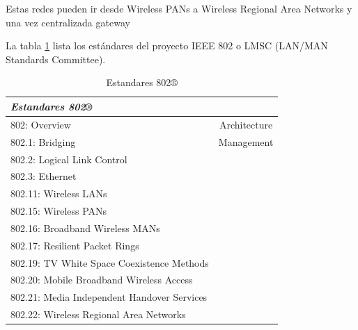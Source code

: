 Estas redes pueden ir desde Wireless PANs a Wireless Regional Area Networks y una vez centralizada gateway


La tabla \ref{tab:802} lista los estándares del proyecto IEEE 802 o LMSC (LAN/MAN Standards Committee).

\vspace{10px}

\begin{table}[ht]
	\centering
	\caption{Estandares 802®}
	\begin{tabular}{@{} l *1c @{}}    \toprule
		\emph{\textbf{Estandares 802®}} \\
		\midrule
        802: Overview & Architecture\\
        802.1: Bridging & Management\\
        802.2: Logical Link Control\\
        802.3: Ethernet\\
        802.11: Wireless LANs\\
        802.15: Wireless PANs\\
        802.16: Broadband Wireless MANs\\
        802.17: Resilient Packet Rings\\
        802.19: TV White Space Coexistence Methods\\
        802.20: Mobile Broadband Wireless Access\\
        802.21: Media Independent Handover Services\\
        802.22: Wireless Regional Area Networks\\
		\bottomrule
		\hline
	\end{tabular}
	\label{tab:802}
\end{table}


